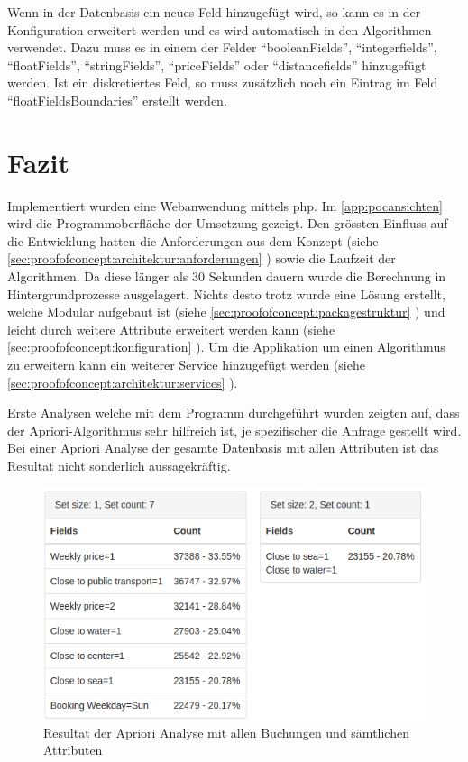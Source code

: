 Wenn in der Datenbasis ein neues Feld hinzugefügt wird, so kann es in der Konfiguration erweitert werden und es wird automatisch in den Algorithmen verwendet. Dazu muss es in einem der Felder "`booleanFields"', "`integerfields"', "`floatFields"', "`stringFields"', "`priceFields"' oder "`distancefields"' hinzugefügt werden. Ist ein diskretiertes Feld, so muss zusätzlich noch ein Eintrag im Feld "`floatFieldsBoundaries"' erstellt werden.


\section{Fazit}
\label{sec:proofofconcept:fazit}
Implementiert wurden eine Webanwendung mittels \gls{php}. Im \cref{app:pocansichten} wird die Programmoberfläche der Umsetzung gezeigt. Den grössten Einfluss auf die Entwicklung hatten die Anforderungen aus dem Konzept (siehe \cref{sec:proofofconcept:architektur:anforderungen} ) sowie die Laufzeit der Algorithmen. Da diese länger als 30 Sekunden dauern wurde die Berechnung in Hintergrundprozesse ausgelagert. Nichts desto trotz wurde eine Lösung erstellt, welche Modular aufgebaut ist (siehe \cref{sec:proofofconcept:packagestruktur} ) und leicht durch weitere Attribute erweitert werden kann (siehe \cref{sec:proofofconcept:konfiguration} ). Um die Applikation um einen Algorithmus zu erweitern kann ein weiterer Service hinzugefügt werden (siehe \cref{sec:proofofconcept:architektur:services} ).

Erste Analysen welche mit dem Programm durchgeführt wurden zeigten auf, dass der Apriori-Algorithmus sehr hilfreich ist, je spezifischer die Anfrage gestellt wird. Bei einer Apriori Analyse der gesamte Datenbasis mit allen Attributen ist das Resultat nicht sonderlich aussagekräftig. 

\begin{figure}[H]
	\RawFloats
	\centering
	\includegraphics[width=1\textwidth]{images/result-of-everything}
	\caption{Resultat der Apriori Analyse mit allen Buchungen und sämtlichen Attributen}
	\label{fig:proofofconcept:fazit:1}
\end{figure}

